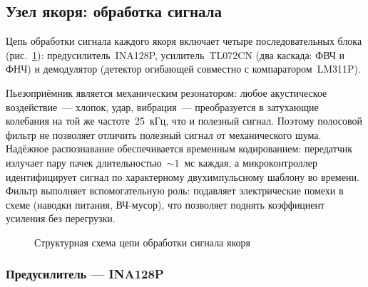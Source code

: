 \FloatBarrier

\subsection{Узел якоря: обработка сигнала}

Цепь обработки сигнала каждого якоря включает четыре последовательных блока
(рис.~\ref{fig:anchor-block}): предусилитель~INA128P, усилитель~TL072CN
(два каскада: ФВЧ и ФНЧ) и демодулятор (детектор огибающей совместно с компаратором~LM311P).

Пьезоприёмник является механическим резонатором: любое акустическое воздействие~---
хлопок, удар, вибрация~--- преобразуется в затухающие колебания на той же частоте~25~кГц,
что и полезный сигнал. Поэтому полосовой фильтр не позволяет отличить полезный сигнал
от механического шума. Надёжное распознавание обеспечивается временным кодированием:
передатчик излучает пару пачек длительностью~${\sim}1$~мс каждая, а микроконтроллер
идентифицирует сигнал по характерному двухимпульсному шаблону во времени. Фильтр выполняет вспомогательную роль: подавляет
электрические помехи в схеме (наводки питания, ВЧ-мусор), что позволяет поднять
коэффициент усиления без перегрузки.

\begin{figure}[h!]
\centering
{}
\caption{Структурная схема цепи обработки сигнала якоря}
\label{fig:anchor-block}
\end{figure}

\subsubsection{Предусилитель --- INA128P}

